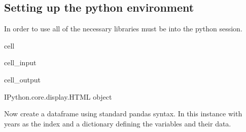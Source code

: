 \documentclass[letterpaper,10pt,english]{jupyterBook}
\begin{document}
\subsection{Setting up the python environment}
\label{\detokenize{content/04_PythonEssentials/UpdateCommand:setting-up-the-python-environment}}
\sphinxAtStartPar
In order to use  all of the necessary libraries must be  into the python session.

\begin{sphinxuseclass}{cell}\begin{sphinxVerbatimInput}

\begin{sphinxuseclass}{cell_input}
\begin{sphinxVerbatim}[commandchars=\\\{\}]
   

    
\end{sphinxVerbatim}

\end{sphinxuseclass}\end{sphinxVerbatimInput}
\begin{sphinxVerbatimOutput}

\begin{sphinxuseclass}{cell_output}
\begin{sphinxVerbatim}[commandchars=\\\{\}]
\PYGZlt{}IPython.core.display.HTML object\PYGZgt{}
\end{sphinxVerbatim}

\end{sphinxuseclass}\end{sphinxVerbatimOutput}

\end{sphinxuseclass}
\sphinxAtStartPar
Now create a dataframe using standard pandas syntax.  In this instance with years as the index and a dictionary defining the variables and their data.
\end{document}
